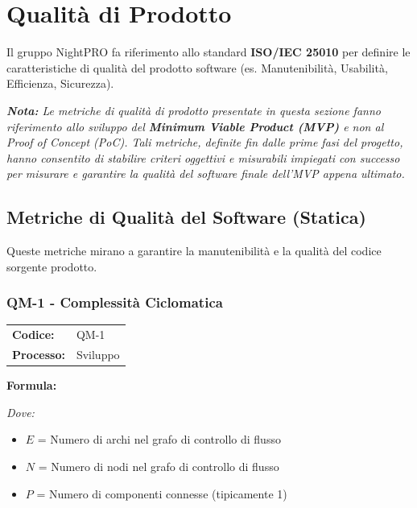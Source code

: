 \documentclass[a4paper,11pt,oneside]{scrartcl}
\begin{document}
\newpage


\section{Qualità di Prodotto}

Il gruppo NightPRO fa riferimento allo standard \textbf{ISO/IEC 25010}{\scriptsize{}} per definire le caratteristiche di qualità del prodotto software (es. Manutenibilità, Usabilità, Efficienza, Sicurezza).

\vspace{0.3cm}
\noindent\textit{\textbf{Nota:} Le metriche di qualità di prodotto presentate in questa sezione fanno riferimento allo sviluppo del \textbf{Minimum Viable Product (MVP)}{\scriptsize{}} e non al Proof of Concept (PoC){\scriptsize{}}. Tali metriche, definite fin dalle prime fasi del progetto, hanno consentito di stabilire criteri oggettivi e misurabili impiegati con successo per misurare e garantire la qualità del software finale dell'MVP appena ultimato.}
\vspace{0.3cm}

\subsection{Metriche di Qualità del Software (Statica)}
Queste metriche mirano a garantire la manutenibilità e la qualità del codice sorgente prodotto.

\subsubsection{QM-1 - Complessità Ciclomatica}

\noindent
\begin{tabular}{@{}p{}p{}@{}}
    \textbf{Codice:}   & QM-1     \\
    \textbf{Processo:} & Sviluppo \\
\end{tabular}

\vspace{0.3cm}
\noindent\textbf{Formula:}

\noindent\textit{Dove:}
\begin{itemize}[leftmargin=1.5cm, topsep=0pt, itemsep=0pt]
    \item $E$ = Numero di archi nel grafo di controllo di flusso
    \item $N$ = Numero di nodi nel grafo di controllo di flusso
    \item $P$ = Numero di componenti connesse (tipicamente 1)
\end{itemize}
\end{document}

